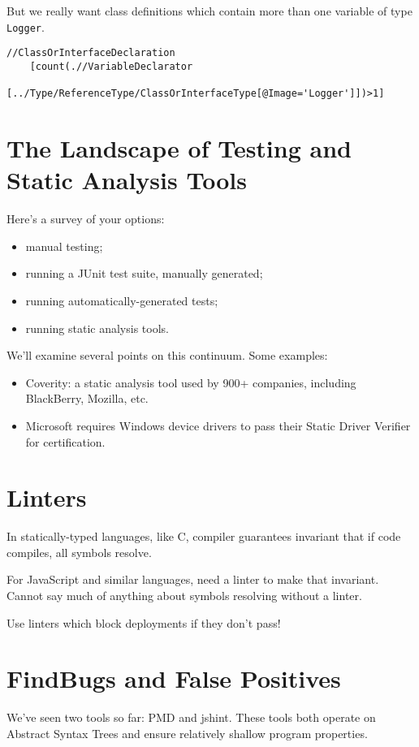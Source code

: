 \documentclass[11pt]{article}
\begin{document}
But we really want class definitions which contain more than one 
variable of type {\tt Logger}. 
\noindent
{\small \begin{verbatim}
//ClassOrInterfaceDeclaration
    [count(.//VariableDeclarator
      [../Type/ReferenceType/ClassOrInterfaceType[@Image='Logger']])>1]
\end{verbatim}

\section*{The Landscape of Testing and Static Analysis Tools}
Here's a survey of your options:
\begin{itemize}[noitemsep]
    \item manual testing;
    \item running a JUnit test suite, manually generated;
    \item running automatically-generated tests;
    \item running static analysis tools.
\end{itemize}
We'll examine several points on this continuum.
Some examples:
\begin{itemize}[noitemsep]
    \item Coverity: a static analysis tool used by 900+ companies,
      including BlackBerry, Mozilla, etc.
    \item Microsoft requires Windows device drivers
      to pass their Static Driver Verifier for certification.
\end{itemize}

\section*{Linters}

In statically-typed languages, like C, compiler guarantees invariant that if code compiles, all symbols resolve.

For JavaScript and similar languages, need a linter to make that invariant. Cannot say much of anything about symbols resolving without a linter.

Use linters which block deployments if they don't pass!

\section*{FindBugs and False Positives}

We've seen two tools so far: PMD and jshint. These tools both operate on
Abstract Syntax Trees and ensure relatively shallow program properties.

}
\end{document}
